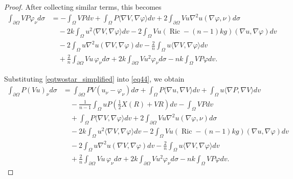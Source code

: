 \documentclass[10pt,a4paper]{amsart}
\begin{document}
\begin{proof}
After collecting similar terms, this becomes
\begin{align}
\int_{\partial\Omega}VP\varphi_{\nu} d\sigma
&=
-\int_{\Omega}VP dv
+
\int_{\Omega}P\langle\nabla V,\nabla\varphi\rangle dv
+
2\int_{\partial\Omega}Vu\nabla^{2}u(\nabla\varphi,\nu) d\sigma
\nonumber\\
&\quad
-
2k\int_{\Omega}u^{2}\langle\nabla V,\nabla\varphi\rangle dv
-
2\int_{\Omega}Vu(\operatorname{Ric}-(n-1)kg)(\nabla u,\nabla\varphi) dv
\nonumber\\
&\quad
-
2\int_{\Omega}u\nabla^{2}u(\nabla V,\nabla\varphi) dv
-
\frac{2}{n}\int_{\Omega}u\langle\nabla V,\nabla\varphi\rangle dv
\nonumber\\
&\quad
+
\frac{2}{n}\int_{\partial\Omega}Vu\,\varphi_{\nu} d\sigma
+
2k\int_{\partial\Omega}Vu^{2}\varphi_{\nu} d\sigma
-
nk\int_{\Omega}VP\varphi dv.
\label{eqtwostar_simplified}
\end{align}

Substituting \eqref{eqtwostar_simplified} into \eqref{eq44}, we obtain
\begin{align}\label{eqstar44}
\int_{\partial\Omega}P(Vu)_{\nu}d\sigma
&=
\int_{\partial\Omega}PV(u_{\nu}-\varphi_{\nu})d\sigma
+
\int_{\Omega}P\langle\nabla u,\nabla V\rangle dv
+
\int_{\Omega}u\langle\nabla P,\nabla V\rangle dv
\nonumber\\
&\quad
-
\frac{1}{n-1}
\int_{\Omega}uP\left(\frac{1}{2}X(R)+VR\right)dv
-
\int_{\Omega}VP dv
\nonumber\\
&\quad
+
\int_{\Omega}P\langle\nabla V,\nabla\varphi\rangle dv
+
2\int_{\partial\Omega}Vu\nabla^{2}u(\nabla\varphi,\nu) d\sigma
\nonumber\\
&\quad
-
2k\int_{\Omega}u^{2}\langle\nabla V,\nabla\varphi\rangle dv
-
2\int_{\Omega}Vu(\operatorname{Ric}-(n-1)kg)(\nabla u,\nabla\varphi) dv
\nonumber\\
&\quad
-
2\int_{\Omega}u\nabla^{2}u(\nabla V,\nabla\varphi)dv
-
\frac{2}{n}\int_{\Omega}u\langle\nabla V,\nabla\varphi\rangle dv
\nonumber\\
&\quad
+
\frac{2}{n}\int_{\partial\Omega}Vu\,\varphi_{\nu}d\sigma
+
2k\int_{\partial\Omega}Vu^{2}\varphi_{\nu}d\sigma
-
nk\int_{\Omega}VP\varphi dv.
\end{align}


\end{proof}
\end{document}
